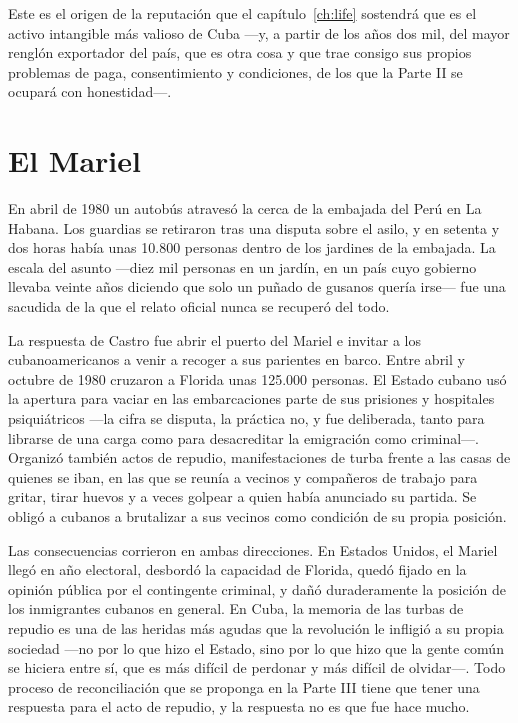 Este es el origen de la reputación que el capítulo~\ref{ch:life} sostendrá que es
el activo intangible más valioso de Cuba ---y, a partir de los años dos mil, del
mayor renglón exportador del país, que es otra cosa y que trae consigo sus
propios problemas de paga, consentimiento y condiciones, de los que la Parte II
se ocupará con honestidad---.

\section{El Mariel}

En abril de 1980 un autobús atravesó la cerca de la embajada del Perú en La
Habana. Los guardias se retiraron tras una disputa sobre el asilo, y en setenta y
dos horas había unas 10.800 personas dentro de los jardines de la embajada. La
escala del asunto ---diez mil personas en un jardín, en un país cuyo gobierno
llevaba veinte años diciendo que solo un puñado de gusanos quería irse--- fue una
sacudida de la que el relato oficial nunca se recuperó del todo.

La respuesta de Castro fue abrir el puerto del Mariel e invitar a los
cubanoamericanos a venir a recoger a sus parientes en barco. Entre abril y
octubre de 1980 cruzaron a Florida unas 125.000 personas. El Estado cubano usó la
apertura para vaciar en las embarcaciones parte de sus prisiones y hospitales
psiquiátricos ---la cifra se disputa, la práctica no, y fue deliberada, tanto
para librarse de una carga como para desacreditar la emigración como criminal---.
Organizó también actos de repudio, manifestaciones de turba frente a las casas de
quienes se iban, en las que se reunía a vecinos y compañeros de trabajo para
gritar, tirar huevos y a veces golpear a quien había anunciado su partida. Se
obligó a cubanos a brutalizar a sus vecinos como condición de su propia posición.

Las consecuencias corrieron en ambas direcciones. En Estados Unidos, el Mariel
llegó en año electoral, desbordó la capacidad de Florida, quedó fijado en la
opinión pública por el contingente criminal, y dañó duraderamente la posición de
los inmigrantes cubanos en general. En Cuba, la memoria de las turbas de repudio
es una de las heridas más agudas que la revolución le infligió a su propia
sociedad ---no por lo que hizo el Estado, sino por lo que hizo que la gente común
se hiciera entre sí, que es más difícil de perdonar y más difícil de olvidar---.
Todo proceso de reconciliación que se proponga en la Parte III tiene que tener una
respuesta para el acto de repudio, y la respuesta no es que fue hace mucho.

